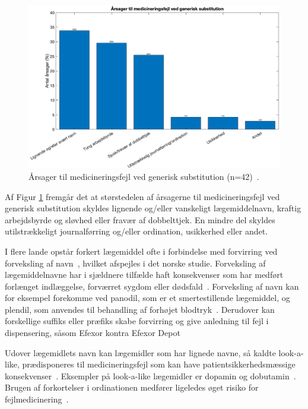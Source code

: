 \begin{figure}[H]\centering	\includegraphics[width=1\textwidth]{billeder/GenSub1.png} 
	\caption{Årsager til medicineringsfejl ved generisk substitution (n=42)~\citep{Hakonsen2010}.}	\label{fig:GeneriskSubstitution1}  
\end{figure}

Af Figur \ref{fig:GeneriskSubstitution1} fremgår det at størstedelen af årsagerne til medicineringsfejl ved generisk substitution skyldes lignende og/eller vanskeligt lægemiddelnavn, kraftig arbejdsbyrde og sløvhed eller fravær af dobbelttjek. En mindre del skyldes utilstrækkeligt journalførring og/eller ordination, usikkerhed eller andet. 

I flere lande opstår forkert lægemiddel ofte i forbindelse med forvirring ved forveksling af navn~\citep{DanskSelskabforPatientsikkerhed2009}, hvilket afspejles i det norske studie. Forveksling af lægemiddelnavne har i sjældnere tilfælde haft konsekvenser som har medført forlænget indlæggelse, forværret sygdom eller dødsfald~\citep{DanskSelskabforPatientsikkerhed2009}. Forveksling af navn kan for eksempel forekomme ved panodil, som er et smertestillende lægemiddel, og plendil, som anvendes til behandling af forhøjet blodtryk~\citep{DanskSelskabforPatientsikkerhed2009}. Derudover kan forskellige suffiks eller præfiks skabe forvirring og give anledning til fejl i dispensering, såsom Efexor kontra Efexor Depot~\citep{DanskSelskabforPatientsikkerhed2009} 

Udover lægemidlets navn kan lægemidler som har lignede navne, så kaldte look-a-like, prædisponeres til medicineringsfejl som kan have patientsikkerhedsmæssige konsekvenser~\citep{Wittich2014}. Eksempler på look-a-like lægemidler er  dopamin og dobutamin~\citep{Wittich2014}. Brugen af forkortelser i ordinationen medfører ligeledes øget risiko for fejlmedicinering~\citep{Wittich2014}.

